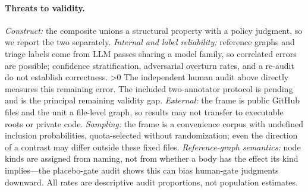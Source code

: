 \paragraph{Threats to validity.}
\label{par:threats}
\emph{Construct:} the composite unions a structural property with a policy
judgment, so we report the two separately. \emph{Internal and label
reliability:} reference graphs and triage labels come from LLM passes sharing a
model family, so correlated errors are possible; confidence stratification,
adversarial overturn rates, and a re-audit do not establish correctness.
\ifnum\humanNflags>0
The independent human audit above directly measures this remaining error.
\else
The included two-annotator protocol is pending and is the principal remaining
validity gap.
\fi
\emph{External:} the frame is
public GitHub files and the unit a file-level graph, so results may not transfer
to executable roots or private code. \emph{Sampling:} the frame is a convenience
corpus with undefined inclusion probabilities, quota-selected without
randomization; even the direction of a contrast may differ outside these fixed
files. \emph{Reference-graph semantics:} node kinds are assigned from
naming, not from whether a body has the effect its kind implies---the
placebo-gate audit shows this can bias human-gate judgments downward. All rates
are descriptive audit proportions, not population estimates.
